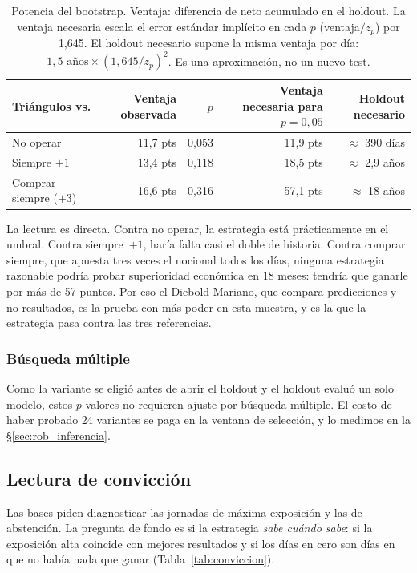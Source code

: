 \documentclass[10pt,a4paper]{article}
\begin{document}
\begin{table}[htb]\centering\small
\begin{tabular}{@{}lrrrr@{}}
\toprule
Triángulos vs. & Ventaja observada & $p$ & Ventaja necesaria para $p=0{,}05$ & Holdout necesario \\
\midrule
No operar              & 11,7 pts & 0,053 & 11,9 pts & $\approx$ 390 días \\
Siempre $+1$           & 13,4 pts & 0,118 & 18,5 pts & $\approx$ 2,9 años \\
Comprar siempre ($+3$) & 16,6 pts & 0,316 & 57,1 pts & $\approx$ 18 años \\
\bottomrule
\end{tabular}
\caption{Potencia del bootstrap. Ventaja: diferencia de neto acumulado en el holdout.
La ventaja necesaria escala el error estándar implícito en cada $p$ (ventaja$/z_p$)
por 1,645. El holdout necesario supone la misma ventaja por día:
$1{,}5\text{ años}\times(1{,}645/z_p)^2$. Es una aproximación, no un nuevo
test.}\label{tab:potencia}
\end{table}

La lectura es directa. Contra no operar, la estrategia está prácticamente en el umbral.
Contra siempre~$+1$, haría falta casi el doble de historia. Contra comprar siempre, que
apuesta tres veces el nocional todos los días, ninguna estrategia razonable podría
probar superioridad económica en 18 meses: tendría que ganarle por más de 57 puntos. Por
eso el Diebold-Mariano, que compara predicciones y no resultados, es la prueba con más
poder en esta muestra, y es la que la estrategia pasa contra las tres referencias.

\subsubsection{Búsqueda múltiple}

Como la variante se eligió antes de abrir el holdout y el holdout evaluó un solo
modelo, estos $p$-valores no requieren ajuste por búsqueda múltiple. El costo de haber
probado 24 variantes se paga en la ventana de selección, y lo medimos en la
§\ref{sec:rob_inferencia}.

\subsection{Lectura de convicción}\label{sec:conviccion}

Las bases piden diagnosticar las jornadas de máxima exposición y las de abstención. La
pregunta de fondo es si la estrategia \emph{sabe cuándo sabe}: si la exposición alta
coincide con mejores resultados y si los días en cero son días en que no había nada que
ganar (Tabla~\ref{tab:conviccion}).
\end{document}
